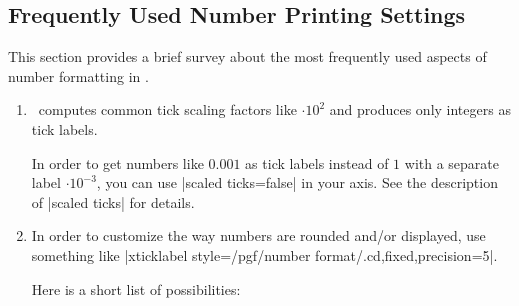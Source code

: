 \subsection{Frequently Used Number Printing Settings}
\label{sec:number:faq}
This section provides a brief survey about the most frequently used aspects of number formatting in \PGFPlots.
\begin{enumerate}
	\item \PGFPlots\ computes common tick scaling factors like $\cdot 10^2$ and produces only integers as tick labels.
	
	In order to get numbers like $0.001$ as tick labels instead of $1$ with a separate label $\cdot 10^{-3}$, you can use |scaled ticks=false| in your axis. See the description of |scaled ticks| for details.

	\item In order to customize the way numbers are rounded and/or displayed,
	use something like |xticklabel style={/pgf/number format/.cd,fixed,precision=5}|.
	
	Here is a short list of possibilities:
\begin{codeexample}[]
\end{codeexample}
\begin{codeexample}[]
\end{codeexample}

\begin{codeexample}[]
\end{codeexample}

\begin{codeexample}[]
\end{codeexample}

\begin{codeexample}[]
\end{codeexample}

\begin{codeexample}[]
\end{codeexample}

\begin{codeexample}[]
\end{codeexample}

\begin{codeexample}[]
\end{codeexample}


\end{enumerate}
